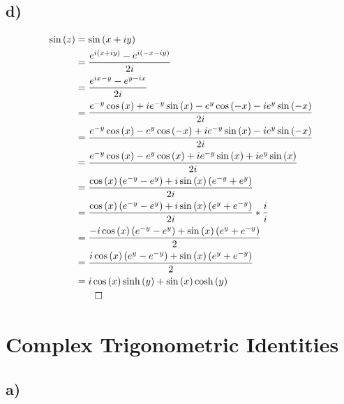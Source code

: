 \documentclass[12pt]{article}
\begin{document}
\subsection{d)}
\begin{align*}
	\sin{(z)} &= \sin{(x+iy)}\\
	&= \frac{e^{i(x+iy)} - e^{i(-x-iy)}}{2i}\\
	&= \frac{e^{ix-y} - e^{y-ix}}{2i}\\
	&= \frac{e^{-y}\cos{(x)} + ie^{-y}\sin{(x)} - e^{y}\cos{(-x)} - ie^{y}\sin{(-x)}}{2i}\\
	&= \frac{e^{-y}\cos{(x)} - e^{y}\cos{(-x)} + ie^{-y}\sin{(x)} - ie^{y}\sin{(-x)}}{2i}\\
	&= \frac{e^{-y}\cos{(x)} - e^{y}\cos{(x)} + ie^{-y}\sin{(x)} + ie^{y}\sin{(x)}}{2i}\\
	&= \frac{\cos{(x)}\left(e^{-y} - e^{y}\right) + i\sin{(x)}\left(e^{-y} + e^{y}\right)}{2i}\\
	&= \frac{\cos{(x)}\left(e^{-y} - e^{y}\right) + i\sin{(x)}\left(e^{y} + e^{-y}\right)}{2i} * \frac{i}{i}\\
	&= \frac{-i\cos{(x)}\left(e^{-y} - e^{y}\right) + \sin{(x)}\left(e^{y} + e^{-y}\right)}{2}\\
	&= \frac{i\cos{(x)}\left(e^{y} - e^{-y}\right) + \sin{(x)}\left(e^{y} + e^{-y}\right)}{2}\\
	&= i\cos{(x)}\sinh{(y)} + \sin{(x)}\cosh{(y)}\\
	&\qed
\end{align*}
\newpage
\section{Complex Trigonometric Identities}
\subsection{a)}
\end{document}
